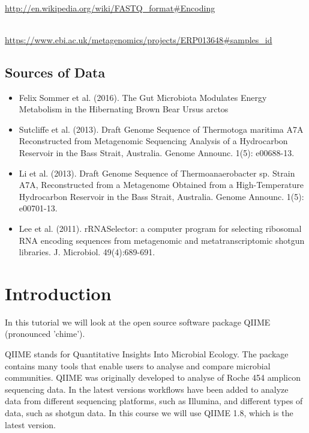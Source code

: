 \begin{description}[style=multiline,labelindent=0cm,align=left,leftmargin=0.5cm]
  \item[FASTQ Encoding]\hfill\\
    \url{http://en.wikipedia.org/wiki/FASTQ_format#Encoding}
  \item [Sommer data ]\hfill\\
    \url{https://www.ebi.ac.uk/metagenomics/projects/ERP013648#samples_id}
\end{description}

\subsection{Sources of Data}
\begin{itemize}
  \item Felix Sommer et al. (2016). The Gut Microbiota Modulates Energy Metabolism in the Hibernating Brown Bear Ursus arctos
  \item Sutcliffe et al. (2013). Draft Genome Sequence of Thermotoga maritima A7A Reconstructed from Metagenomic Sequencing Analysis of a Hydrocarbon Reservoir in the Bass Strait, Australia. Genome Announc. 1(5): e00688-13.
  \item Li et al. (2013). Draft Genome Sequence of Thermoanaerobacter sp. Strain A7A, Reconstructed from a Metagenome Obtained from a High-Temperature Hydrocarbon Reservoir in the Bass Strait, Australia. Genome Announc. 1(5): e00701-13.
  \item Lee et al. (2011). rRNASelector: a computer program for selecting ribosomal RNA encoding sequences from metagenomic and metatranscriptomic shotgun libraries. J. Microbiol. 49(4):689-691.
\end{itemize}


\newpage


\section{Introduction}

\begin{note}
In this tutorial we will look at the open source software package QIIME (pronounced 'chime').
\end{note}

QIIME stands for Quantitative Insights Into Microbial Ecology. The package contains many tools that enable users to analyse and compare microbial communities. QIIME was originally developed to analyse of Roche 454 amplicon sequencing data. In the latest versions workflows have been added to analyze data from different sequencing platforms, such as Illumina, and different types of data, such as shotgun data. In this course we will use QIIME 1.8, which is the latest version.

